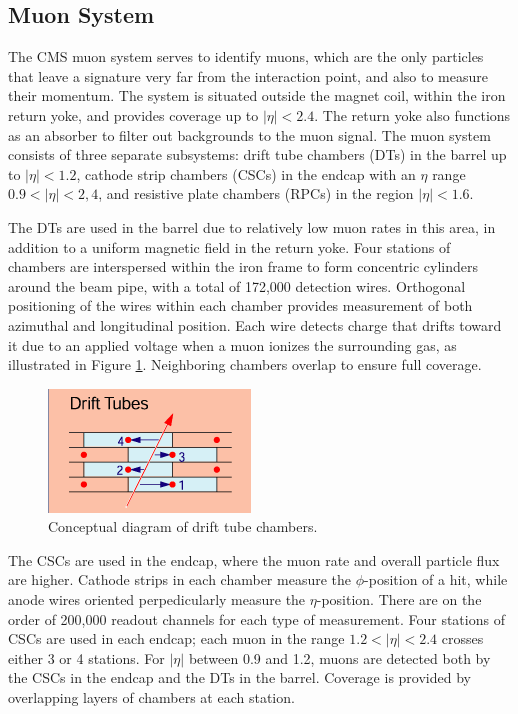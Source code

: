 \subsection{Muon System}
\label{exp:muons}
The CMS muon system serves to identify muons, 
which are the only particles that leave a signature 
very far from the interaction point,
and also to measure their momentum.  
The system is situated outside the magnet coil, 
within the iron return yoke, 
and provides coverage up to $|\eta| < 2.4$.  
The return yoke also functions as an absorber 
to filter out backgrounds to the muon signal.  
The muon system consists of three separate subsystems: 
drift tube chambers (DTs) in the barrel up to $|\eta| < 1.2$, 
cathode strip chambers (CSCs) in the endcap 
with an $\eta$ range $ 0.9 < |\eta| < 2,4$, 
and resistive plate chambers (RPCs) %
in the region $ |\eta| < 1.6$.  

The DTs are used in the barrel due to 
relatively low muon rates in this area, 
in addition to a uniform magnetic field in the 
return yoke.  
Four stations of chambers are interspersed 
within the iron frame to form %
concentric cylinders around the beam pipe, 
with a total of 
172,000 detection wires.  
Orthogonal positioning of the wires 
within each chamber provides measurement of 
both azimuthal and longitudinal position.  
Each wire detects charge that drifts toward it 
due to an applied voltage when a muon ionizes 
the surrounding gas, as illustrated in 
Figure \ref{fig:DTconcept}.  
Neighboring chambers overlap 
to ensure full coverage.  

 \begin{figure}[htb]
  \begin{center}
    \includegraphics[]{Figures/muon-DT-concept.png}
  \end{center}
  \caption[\fixspacing Conceptual diagram of drift tube chambers]
	  {\fixspacing Conceptual diagram of drift tube chambers.}
  \label{fig:DTconcept}
 \end{figure}

The CSCs are used in the endcap, 
where the muon rate and overall particle flux 
are higher.  
Cathode strips in each chamber 
measure the $\phi$-position of a hit, 
while anode wires oriented perpedicularly measure 
the $\eta$-position.  
There are on the order of 200,000 readout channels 
for each type of measurement.  
Four stations of CSCs are used in each endcap; 
each muon in the range $1.2 < |\eta| <2.4$ crosses either 
3 or 4 stations.  
For $|\eta|$ between 0.9 and 1.2, muons are detected 
both by the CSCs in the endcap and the DTs in the barrel.  
Coverage is provided by overlapping layers of chambers 
at each station.  

